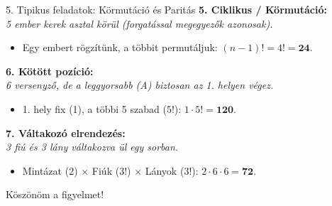 \documentclass{beamer}
\begin{document}
\begin{frame}{5. Tipikus feladatok: Körmutáció és Paritás}
    \small
    \textbf{5. Ciklikus / Körmutáció:} \\
    \emph{5 ember kerek asztal körül (forgatással megegyezők azonosak).}
    \begin{itemize}
        \item Egy embert rögzítünk, a többit permutáljuk: $(n-1)! = 4! = \mathbf{24}$.
    \end{itemize}

    \vspace{0.2cm}
    \textbf{6. Kötött pozíció:} \\
    \emph{6 versenyző, de a leggyorsabb (A) biztosan az 1. helyen végez.}
    \begin{itemize}
        \item 1. hely fix (1), a többi 5 szabad ($5!$): $1 \cdot 5! = \mathbf{120}$.
    \end{itemize}

    \vspace{0.2cm}
    \textbf{7. Váltakozó elrendezés:} \\
    \emph{3 fiú és 3 lány váltakozva ül egy sorban.}
    \begin{itemize}
        \item Mintázat (2) $\times$ Fiúk ($3!$) $\times$ Lányok ($3!$): $2 \cdot 6 \cdot 6 = \mathbf{72}$.
    \end{itemize}
\end{frame}

\begin{frame}
    \centering
    \Huge Köszönöm a figyelmet!
\end{frame}
\end{document}
